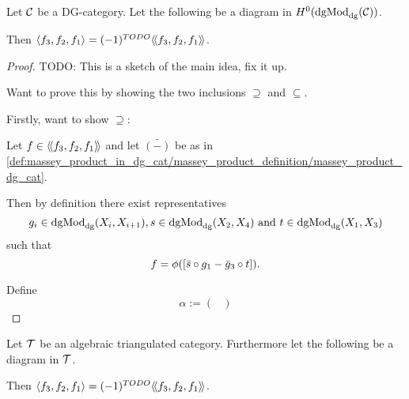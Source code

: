 \begin{theorem}
    Let \( {\mathcal{C}} \) be a DG-category. Let the following be a diagram in \( H^0(\operatorname{dgMod}_{\operatorname{dg}}({\mathcal{C}})) \).
    \begin{center}
    \end{center}
    Then \( \langle f_3, f_2, f_1\rangle = (-1)^{TODO} \langle \! \langle f_3, f_2, f_1\rangle \! \rangle \).
\end{theorem}
\begin{proof}
    TODO: This is a sketch of the main idea, fix it up.

    Want to prove this by showing the two inclusions \( \supseteq \) and \( \subseteq \).

    Firstly, want to show \( \supseteq \):

    Let \( f \in \langle \! \langle f_3, f_2, f_1\rangle \! \rangle \) and let \( \bar{(-)} \) be as in \autoref{def:massey_product_in_dg_cat/massey_product_definition/massey_product_dg_cat}.
    
    Then by definition there exist representatives
    \[
        g_i \in \operatorname{dgMod}_{\operatorname{dg}}(X_i, X_{i + 1}), s \in \operatorname{dgMod}_{\operatorname{dg}}(X_2, X_4) \text{ and } t \in \operatorname{dgMod}_{\operatorname{dg}}(X_1, X_3)
    \]
    such that
    \[
        f = \phi([\bar{s} \circ g_1 - \bar{g}_3 \circ t]).
    \]

    Define
    \[
        \alpha := 
        \begin{pmatrix}
            
        \end{pmatrix}
    \]

\end{proof}

\begin{corollary}
    Let \( {\mathcal{T}} \) be an algebraic triangulated category. Furthermore let the following be a diagram in \( {\mathcal{T}} \).
    \begin{center}
    \end{center}
    Then \( \langle f_3, f_2, f_1\rangle = (-1)^{TODO} \langle \! \langle f_3, f_2, f_1\rangle \! \rangle \).
\end{corollary}
